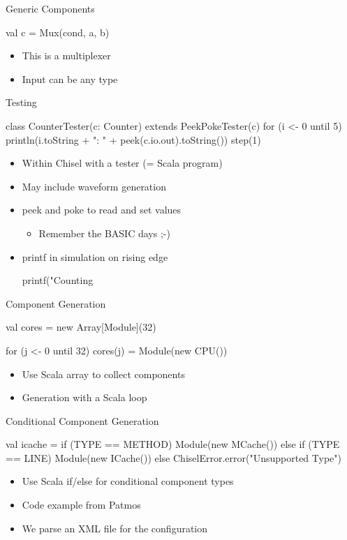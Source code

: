 \documentclass[xcolor=pdflatex,dvipsnames,table]{beamer}
\begin{document}
\begin{frame}[fragile]{Generic Components}
\begin{chisel}
val c = Mux(cond, a, b)
\end{chisel}
\begin{itemize}
\item This is a multiplexer
\item Input can be any type
\end{itemize}
\end{frame}

\begin{frame}[fragile]{Testing}
\begin{chisel}
class CounterTester(c: Counter) extends PeekPokeTester(c) {
  for (i <- 0 until 5) {
    println(i.toString + ": " + peek(c.io.out).toString())
    step(1)
  }
}
\end{chisel}
\begin{itemize}
\item Within Chisel with a tester (= Scala program)
\item May include waveform generation
\item peek and poke to read and set values
\begin{itemize}
\item Remember the BASIC days ;-)
\end{itemize}
\item printf in simulation on rising edge
\begin{chisel}
printf("Counting %
\end{chisel}
\end{itemize}
\end{frame}

\begin{frame}[fragile]{Component Generation}
\begin{chisel}
val cores = new Array[Module](32)

for (j <- 0 until 32)
  cores(j) = Module(new CPU())
\end{chisel}
\begin{itemize}
\item Use Scala array to collect components
\item Generation with a Scala loop
\end{itemize}
\end{frame}

\begin{frame}[fragile]{Conditional Component Generation}
\begin{chisel}
val icache =
  if (TYPE == METHOD)
    Module(new MCache())
  else if (TYPE == LINE)
    Module(new ICache())
  else
    ChiselError.error("Unsupported Type")
\end{chisel}
\begin{itemize}
\item Use Scala if/else for conditional component types
\item Code example from Patmos
\item We parse an XML file for the configuration
\end{itemize}
\end{frame}
\end{document}
